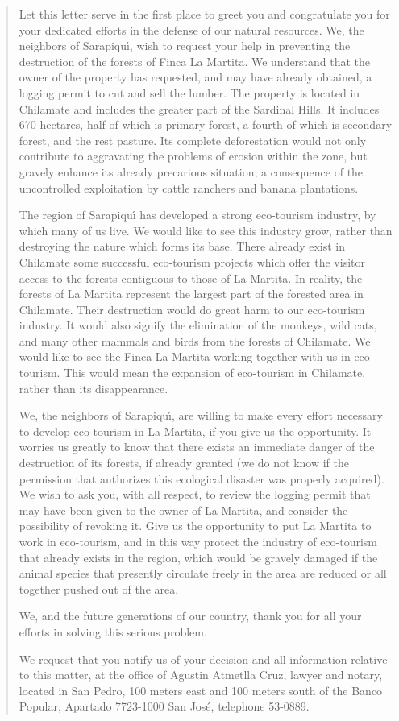 \begin{quote}

     Let this letter serve in the first place to greet you and
congratulate you for your dedicated efforts in the defense of our
natural resources.  We, the neighbors of Sarapiqu\'{\i}, wish to request
your help in preventing the destruction of the forests of Finca
La Martita.  We understand that the owner of the property has
requested, and may have already obtained, a logging permit to cut
and sell the lumber.  The property is located in Chilamate and
includes the greater part of the Sardinal Hills.  It includes 670
hectares, half of which is primary forest, a fourth of which is
secondary forest, and the rest pasture.  Its complete deforestation
would not only contribute to aggravating the problems of erosion
within the zone, but gravely enhance its already precarious
situation, a consequence of the uncontrolled exploitation by cattle
ranchers and banana plantations.

     The region of Sarapiqu\'{\i} has developed a strong eco-tourism
industry, by which many of us live.  We would like to see this
industry grow, rather than destroying the nature which forms its
base.  There already exist in Chilamate some successful eco-tourism
projects which offer the visitor access to the forests contiguous
to those of La Martita.  In reality, the forests of La Martita
represent the largest part of the forested area in Chilamate.  Their
destruction would do great harm to our eco-tourism industry.  It
would also signify the elimination of the monkeys, wild cats, and
many other mammals and birds from the forests of Chilamate.  We
would like to see the Finca La Martita working together with us in
eco-tourism.  This would mean the expansion of eco-tourism in
Chilamate, rather than its disappearance.

     We, the neighbors of Sarapiqu\'{\i}, are willing to make every
effort necessary to develop eco-tourism in La Martita, if you give
us the opportunity.  It worries us greatly to know that there exists
an immediate danger of the destruction of its forests, if already
granted (we do not know if the permission that authorizes this
ecological disaster was properly acquired).  We wish to ask you,
with all respect, to review the logging permit that may have been
given to the owner of La Martita, and consider the possibility of
revoking it.  Give us the opportunity to put La Martita to work in
eco-tourism, and in this way protect the industry of eco-tourism
that already exists in the region, which would be gravely damaged
if the animal species that presently circulate freely in the area
are reduced or all together pushed out of the area.

     We, and the future generations of our country, thank you for
all your efforts in solving this serious problem.

     We request that you notify us of your decision and all
information relative to this matter, at the office of Agustin
Atmetlla Cruz, lawyer and notary, located in San Pedro, 100 meters
east and 100 meters south of the Banco Popular, Apartado 7723-1000
San Jos\'{e}, telephone 53-0889.

\end{quote}

